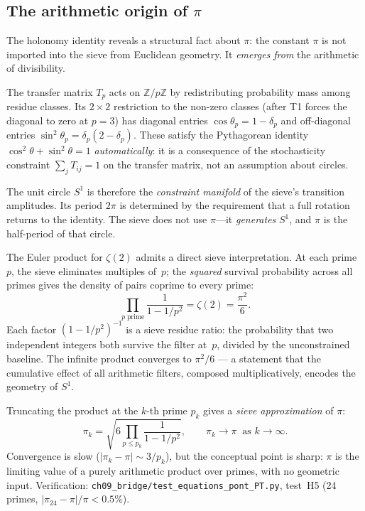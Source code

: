 \documentclass[12pt,a4paper]{article}
\begin{document}
\subsection{The arithmetic origin of $\pi$}
\label{sec:pi_origin}

The holonomy identity reveals a structural fact about $\pi$:
the constant $\pi$ is not imported into the sieve from Euclidean
geometry. It \emph{emerges from} the arithmetic of divisibility.

\begin{remark}
\label{rem:why_circle}
The transfer matrix $T_p$ acts on $\mathbb{Z}/p\mathbb{Z}$ by
redistributing probability mass among residue classes. Its $2 \times 2$
restriction to the non-zero classes (after T1 forces the diagonal
to zero at $p = 3$) has diagonal entries $\cos\theta_p = 1 - \delta_p$
and off-diagonal entries $\sin^2\!\theta_p = \delta_p(2 - \delta_p)$.
These satisfy the Pythagorean identity $\cos^2\theta + \sin^2\theta = 1$
\emph{automatically}: it is a consequence of the stochasticity constraint
$\sum_j T_{ij} = 1$ on the transfer matrix, not an assumption about
circles.

The unit circle $S^1$ is therefore the \emph{constraint manifold} of the
sieve's transition amplitudes. Its period $2\pi$ is determined by the
requirement that a full rotation returns to the identity. The sieve
does not use $\pi$---it \emph{generates} $S^1$, and $\pi$ is the
half-period of that circle.
\end{remark}

\begin{remark}
\label{rem:pi_computation}
The Euler product for $\zeta(2)$ admits a direct sieve interpretation.
At each prime~$p$, the sieve eliminates multiples of~$p$; the
\emph{squared} survival probability across all primes gives the
density of pairs coprime to every prime:
\begin{equation}
  \prod_{p\;\text{prime}} \frac{1}{1 - 1/p^2} = \zeta(2) = \frac{\pi^2}{6}.
  \label{eq:euler_pi}
\end{equation}
Each factor $(1 - 1/p^2)^{-1}$ is a sieve residue ratio: the
probability that two independent integers both survive the filter
at~$p$, divided by the unconstrained baseline. The infinite product
converges to $\pi^2/6$ --- a statement that the cumulative effect of
all arithmetic filters, composed multiplicatively, encodes the
geometry of $S^1$.

Truncating the product at the $k$-th prime $p_k$ gives a
\emph{sieve approximation} of $\pi$:
\begin{equation}
  \pi_k = \sqrt{6 \prod_{p \leq p_k} \frac{1}{1 - 1/p^2}},
  \qquad \pi_k \to \pi \;\;\text{as } k \to \infty.
  \label{eq:pi_sieve}
\end{equation}
Convergence is slow ($|\pi_k - \pi| \sim 3/p_k$), but the
conceptual point is sharp: $\pi$ is the limiting value of a purely
arithmetic product over primes, with no geometric input.
Verification: \texttt{ch09\_bridge/test\_equations\_pont\_PT.py}, test~H5 (24
primes, $|\pi_{24} - \pi|/\pi < 0.5\%$).
\end{remark}
\end{document}

